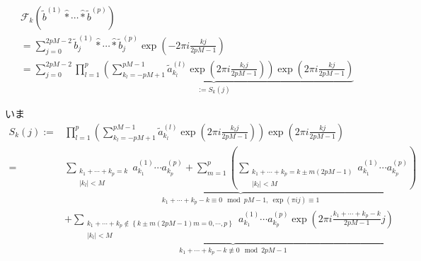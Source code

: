\documentclass[11pt,a4paper,titlepage]{jsreport}
\theoremstyle{definition}
\begin{document}
\begin{description}
\begin{align*}
       & \mathcal{F}_k \left( \tilde{b}^{(1)} \hat{*} \cdots \hat{*} \tilde{b}^{(p)} \right)                                                                                                                            \\
       & = \sum_{j=0}^{2pM-2}  \tilde{b}^{(1)}_j \hat{*} \cdots \hat{*} \tilde{b}^{(p)}_j \exp\left(-2\pi i \frac{kj}{2pM-1}\right)                                                                                     \\
       & = \sum_{j=0}^{2pM-2} \underbrace{ \prod_{l=1}^p  \left( \sum_{k_l=-pM+1}^{pM-1} \tilde{a}_{k_l}^{(l)} \exp\left(2\pi i \frac{k_lj}{2pM-1} \right) \right) \exp\left(2\pi i \frac{kj}{2pM-1}\right)}_{:=S_k(j)}
    \end{align*}

    いま
    \begin{align*}
      S_k(j) := & \prod_{l=1}^p  \left( \sum_{k_l=-pM+1}^{pM-1} \tilde{a}_{k_l}^{(l)} \exp\left(2\pi i \frac{k_lj}{2pM-1} \right) \right) \exp\left(2\pi i \frac{kj}{2pM-1}\right) \\
      =         & \underbrace{\sum_{\substack{{k_1+\cdots+k_p=k}                                                                                                                   \\ {|k_l|<M}}} a_{k_1}^{(1)}\cdots a_{k_p}^{(p)} + \sum_{m=1}^{p} \left( \sum_{\substack{k_1+\cdots+k_p=k \pm m(2pM-1) \\ |k_l|<M}} a_{k_1}^{(1)} \cdots a_{k_p}^{(p)} \right) }_{k_1+\cdots+k_p-k \equiv 0 \mod pM-1,\ \exp(\pi ij)\equiv 1} \\
                & + \underbrace{\sum_{\substack{k_1+\cdots+k_p \notin \left\{ k \pm m(2pM-1)m=0,\cdots,p \right\}                                                                  \\ |k_l|<M}} a_{k_1}^{(1)} \cdots a_{k_p}^{(p)} \exp \left( 2\pi i \frac{k_1+\cdots+k_p-k}{2pM-1}j \right)}_{k_1+\cdots+k_p-k \not\equiv 0 \mod 2pM-1}
    \end{align*}


\end{description}
\end{document}
